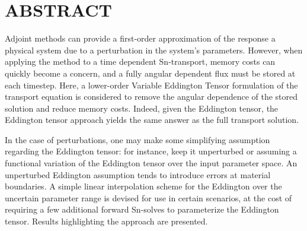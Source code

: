 
\chapter*{ABSTRACT}

\pagestyle{plain} %
\setcounter{page}{2}

Adjoint methods can provide a first-order approximation of the response a physical system due to a perturbation in the system's parameters. However, when applying the method to a time dependent Sn-transport, memory costs can quickly become a concern, and a fully angular dependent flux must be stored at each timestep. Here, a lower-order Variable Eddington Tensor formulation of the transport equation is considered to remove the angular dependence of the stored solution and reduce memory costs. Indeed, given the Eddington tensor, the Eddington tensor approach yields the same answer as the full transport solution.

In the case of perturbations, one may make some simplifying assumption regarding the Eddington tensor: for instance, keep it unperturbed or assuming a functional variation of the Eddington tensor over the input parameter space. An unperturbed Eddington assumption tends to introduce errors at material boundaries. A simple linear interpolation scheme for the Eddington over the uncertain parameter range is devised for use in certain scenarios, at the cost of requiring a few additional forward Sn-solves to parameterize the Eddington tensor. Results highlighting the approach are presented.


 

\pagebreak{}
